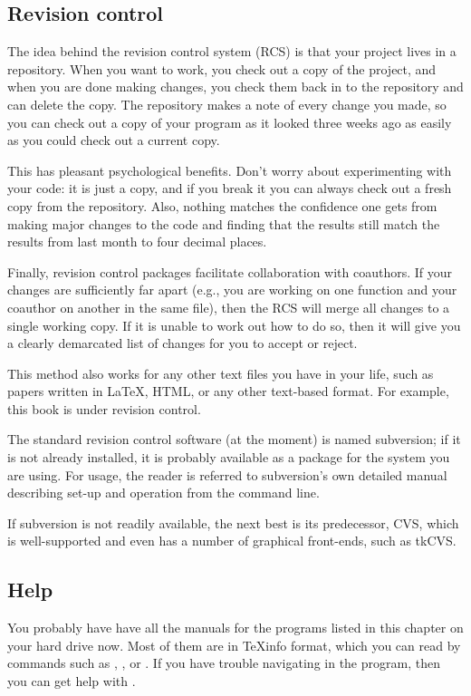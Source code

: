 \documentclass[12pt]{article}
\begin{document}
\subsection{Revision control}  \label{valgrind}
The idea behind the revision control system (RCS) is that your project
lives in a repository. When you want to work, you check out
a copy of the project, and when you are done making changes, you check
them back in to the repository and can delete the copy.  The repository
makes a note of every change you made, so you can check out a copy of
your program as it looked three weeks ago as easily as you could check
out a current copy.

This has pleasant psychological benefits. Don't worry about experimenting
with your code: it is just a copy, and if you break it you can always check
out a fresh copy from the repository. Also, nothing matches the confidence
one gets from making major changes to the code and finding that the
results still match the results from last month to four decimal places.

Finally, revision control packages facilitate collaboration with
coauthors. If your changes are sufficiently far apart (e.g., you are
working on one function and your coauthor on another in the same file),
then the RCS will merge all changes to a single working copy. If
it is unable to work out how to do so, then it will give you a
clearly demarcated list of changes for you to accept or reject.

This method also works for any other text files you have in your
life, such as papers written in \LaTeX, HTML, or any other text-based
format. For example, this book is under revision control.

The standard revision control software (at the moment) is named
subversion; if it is not already installed, it is probably available as
a package for the system you are using. For usage, the reader is referred
to subversion's own detailed manual describing set-up and operation from
the command line.

If subversion is not readily available, the next best is its predecessor,
CVS, which is well-supported and even has a number of graphical
front-ends, such as tkCVS.  

\subsection{Help} 
You probably have have all the manuals for the programs listed in this
chapter on your hard drive now. Most of them are in \TeX info format,
which you can read by commands such as , ,
or . If you have trouble navigating in the 
program, then you can get help with .
\end{document}
